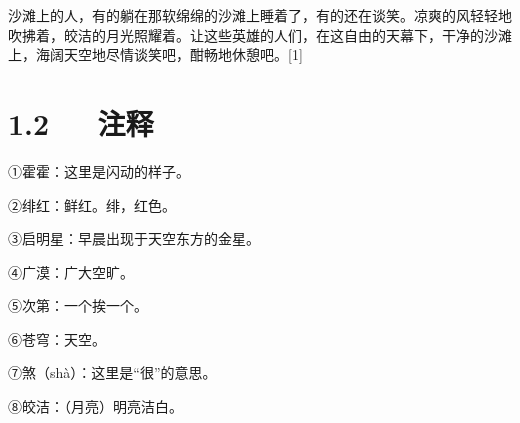 \documentclass[letterpaper,10pt,english]{sphinxmanual}
\begin{document}
沙滩上的人，有的躺在那软绵绵的沙滩上睡着了，有的还在谈笑。凉爽的风轻轻地吹拂着，皎洁的月光照耀着。让这些英雄的人们，在这自由的天幕下，干净的沙滩上，海阔天空地尽情谈笑吧，酣畅地休憩吧。{[}1{]}


\section{1.2   注释}
\label{\detokenize{p01_u6563_u6587/_u5cfb_u9752-_u6d77_u6ee8_u4ef2_u590f_u591c:id4}}
①霍霍：这里是闪动的样子。

②绯红：鲜红。绯，红色。

③启明星：早晨出现于天空东方的金星。

④广漠：广大空旷。

⑤次第：一个挨一个。

⑥苍穹：天空。

⑦煞（shà）：这里是“很”的意思。

⑧皎洁：（月亮）明亮洁白。
\end{document}
